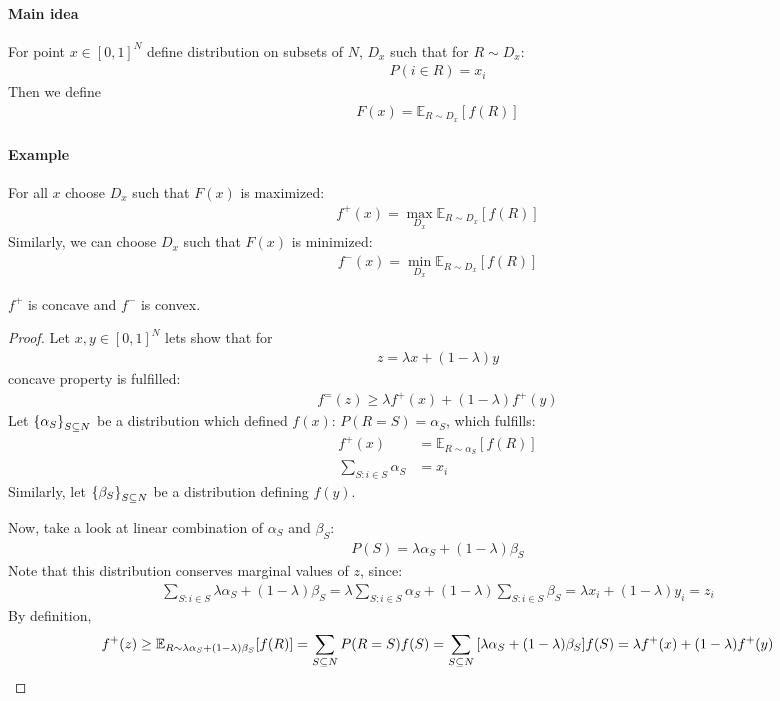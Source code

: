 \paragraph{Main idea}
For point $x\in [0,1]^N$ define distribution on subsets of $N$, $D_x$ such that for $R\sim D_x$:
\begin{align}
	P(i \in R) = x_i
\end{align}
Then we define 
\begin{align}
	F(x) = \mathbb{E}_{R\sim D_x} [f(R)]
\end{align}

\paragraph{Example}
For all $x$ choose $D_x$ such that $F(x)$ is maximized:
\begin{align}
f^+(x)  = \max\limits_{D_x}  \mathbb{E}_{R\sim D_x} [f(R)]
\end{align}
Similarly, we can choose $D_x$ such that $F(x)$ is minimized:
\begin{align}
f^-(x)  = \min\limits_{D_x}  \mathbb{E}_{R\sim D_x} [f(R)]
\end{align}

\begin{prop}
	$f^+$ is concave and $f^-$ is convex.
	\begin{proof}
		Let $x,y\in [0,1]^N$ lets show that for
		\begin{align}
			z = \lambda x + (1-\lambda)y
		\end{align}
		concave property is fulfilled:
		\begin{align}
		f^=(z) \geq \lambda f^+(x) +  (1-\lambda)f^+(y) 
		\end{align}
		Let $\qty{\alpha_S}_{S\subseteq N}$ be a distribution which defined $f(x)$: $P(R = S) = \alpha_S$, which fulfills:
		\begin{align}
		f^+(x) &= \mathbb{E}_{R\sim \alpha_S} [f(R)] \\
		\sum_{S: i\in S} \alpha_S &= x_i
		\end{align}
		Similarly, let $\qty{\beta_S}_{S\subseteq N}$ be a distribution defining $f(y)$.
		
		Now, take a look at linear combination of $\alpha_S$ and $\beta_S$:
		\begin{align}
		P(S) = \lambda\alpha_S + (1-\lambda)\beta_S
		\end{align}
		Note that this distribution conserves marginal values of $z$, since:
		\begin{align}
		\sum_{S: i\in S} \lambda \alpha_S + (1-\lambda) \beta_S = \lambda \sum_{S: i\in S} \alpha_S + (1-\lambda) \sum_{S: i\in S}\beta_S = \lambda x_i + (1-\lambda) y_i = z_i
		\end{align} 
		By definition,
		\begin{align}
		f^+(z) \geq  \mathbb{E}_{R\sim\lambda \alpha_S + (1-\lambda) \beta_S} [f(R)] = \sum_{S \subseteq N} P(R=S) f(S) = \sum_{S \subseteq N} \qty[\lambda \alpha_S + (1-\lambda) \beta_S]f(S) = \lambda f^+(x) + (1-\lambda) f^+(y)
		\end{align}
	\end{proof}
\end{prop}

